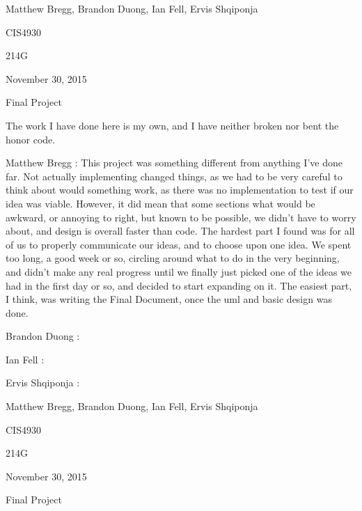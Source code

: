 \documentclass{article}
\begin{document}
\begin{flushright}
Matthew Bregg, Brandon Duong, Ian Fell, Ervis Shqiponja
\end{flushright}
\begin{flushright}
CIS4930
\end{flushright}
\begin{flushright}
214G
\end{flushright}
\begin{flushright}
November 30, 2015
\end{flushright}
\begin{flushright}
Final Project 
\end{flushright}
The work I have done here is my own, and I have neither broken nor bent the honor code.
\newline
\begin{list}{Learning Experiance, }{}
\item Matthew Bregg : This project was something different from anything I've done far. Not actually implementing changed things, as we had to be very careful to think about would something work, as there was no implementation to test if our idea was viable. However, it did mean that some sections what would be awkward, or annoying to right, but known to be possible, we didn't have to worry about, and design is overall faster than code. The hardest part I found was for all of us to properly communicate our ideas, and to choose upon one idea. We spent too long, a good week or so, circling around what to do in the very beginning, and didn't make any real progress until we finally just picked one of the ideas we had in the first day or so, and decided to start expanding on it. The easiest part, I think, was writing the Final Document, once the uml and basic design was done. 
\item Brandon Duong : 
\item Ian Fell : 
\item Ervis Shqiponja :

\end{list}
\newpage

\begin{flushright}
Matthew Bregg, Brandon Duong,  Ian Fell, Ervis Shqiponja
\end{flushright}
\begin{flushright}
CIS4930
\end{flushright}
\begin{flushright}
214G
\end{flushright}
\begin{flushright}
November 30, 2015
\end{flushright}
\begin{flushright}
Final Project
\end{flushright}
\end{document}
